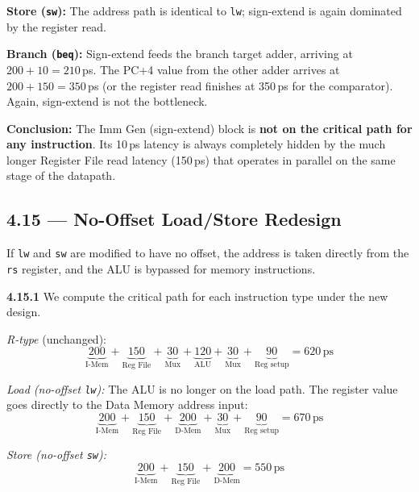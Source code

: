 \medskip\noindent\textbf{Store (\texttt{sw}):}
The address path is identical to \texttt{lw}; sign-extend is again dominated
by the register read.

\medskip\noindent\textbf{Branch (\texttt{beq}):}
Sign-extend feeds the branch target adder, arriving at $200 + 10 = 210$\,ps.
The PC+4 value from the other adder arrives at $200 + 150 = 350$\,ps (or the
register read finishes at 350\,ps for the comparator). Again, sign-extend is
not the bottleneck.

\medskip\noindent\textbf{Conclusion:} The Imm Gen (sign-extend) block is
\textbf{not on the critical path for any instruction}. Its 10\,ps latency is
always completely hidden by the much longer Register File read latency
(150\,ps) that operates in parallel on the same stage of the datapath.

\subsection*{4.15 --- No-Offset Load/Store Redesign}
\hypertarget{sol-4.15}{}

If \texttt{lw} and \texttt{sw} are modified to have no offset, the address is
taken directly from the \texttt{rs} register, and the ALU is bypassed for
memory instructions.

\medskip\noindent\textbf{4.15.1}
We compute the critical path for each instruction type under the new design.

\medskip\noindent\textit{R-type} (unchanged):
\[
  \underbrace{200}_{\text{I-Mem}} +
  \underbrace{150}_{\text{Reg File}} +
  \underbrace{30}_{\text{Mux}} +
  \underbrace{120}_{\text{ALU}} +
  \underbrace{30}_{\text{Mux}} +
  \underbrace{90}_{\text{Reg setup}}
  = 620\,\text{ps}
\]

\medskip\noindent\textit{Load (no-offset \texttt{lw}):}
The ALU is no longer on the load path. The register value goes directly to the
Data Memory address input:
\[
  \underbrace{200}_{\text{I-Mem}} +
  \underbrace{150}_{\text{Reg File}} +
  \underbrace{200}_{\text{D-Mem}} +
  \underbrace{30}_{\text{Mux}} +
  \underbrace{90}_{\text{Reg setup}}
  = 670\,\text{ps}
\]

\medskip\noindent\textit{Store (no-offset \texttt{sw}):}
\[
  \underbrace{200}_{\text{I-Mem}} +
  \underbrace{150}_{\text{Reg File}} +
  \underbrace{200}_{\text{D-Mem}}
  = 550\,\text{ps}
\]

